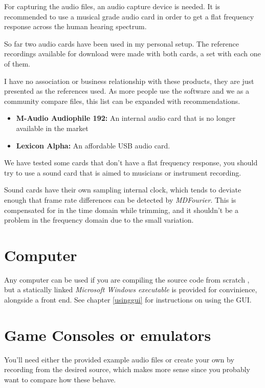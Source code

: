 \documentclass[10pt,a4paper]{report}
\begin{document}
\begin{appendices}
For capturing the audio files, an audio capture device is needed. It is recommended to use a musical grade audio card in order to get a flat frequency response across the human hearing spectrum.

So far two audio cards have been used in my personal setup. The reference recordings available for download were made with both cards, a set with each one of them.

I have no association or business relationship with these products, they are just presented as the references used. As more people use the software and we as a community compare files, this list can be expanded with recommendations.

\begin{itemize}
	\item \textbf{M-Audio Audiophile 192:} An internal audio card that is no longer available in the market \cite{maudio}
	\item \textbf{Lexicon Alpha:} An affordable USB audio card. \cite{lexicon}
\end{itemize}

We have tested some cards that don't have a flat frequency response, you should try to use a sound card that is aimed to musicians or instrument recording.

Sound cards have their own sampling internal clock, which tends to deviate enough that frame rate differences can be detected by \textit{MDFourier}. This is compensated for in the time domain while trimming, and it shouldn't be a problem in the frequency domain due to the small variation. \cite{SoundCardClock}

\section{Computer}

Any computer can be used if you are compiling the source code from scratch \cite{sourcecode}, but a statically linked \textit{Microsoft Windows executable} is provided for convinience, alongside a front end. See chapter \ref{usinggui} for instructions on using the GUI.

\section{Game Consoles or emulators}

You'll need either the provided example audio files or create your own by recording from the desired source, which makes more sense since you probably want to compare how these behave.


\end{appendices}
\end{document}
